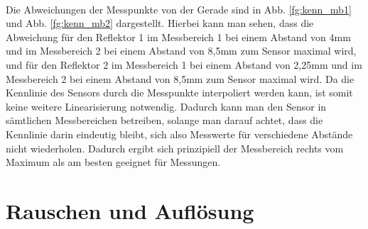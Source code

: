 ~\\
Die Abweichungen der Messpunkte von der Gerade sind in Abb. \ref{fg:kenn_mb1} und Abb. \ref{fg:kenn_mb2} dargestellt. Hierbei kann man sehen, dass die Abweichung für den Reflektor 1 im Messbereich 1 bei einem Abstand von 4mm und im Messbereich 2 bei einem Abstand von 8,5mm zum Sensor maximal wird, und für den Reflektor 2 im Messbereich 1 bei einem Abstand von 2,25mm und im Messbereich 2 bei einem Abstand von 8,5mm zum Sensor maximal wird. Da die Kennlinie des Sensors durch die Messpunkte interpoliert werden kann, ist somit keine weitere Linearisierung notwendig. Dadurch kann man den Sensor in sämtlichen Messbereichen betreiben, solange man darauf achtet, dass die Kennlinie darin eindeutig bleibt, sich also Messwerte für verschiedene Abstände nicht wiederholen. Dadurch ergibt sich prinzipiell der Messbereich rechts vom Maximum als am besten geeignet für Messungen.

\section{Rauschen und Auflösung}

